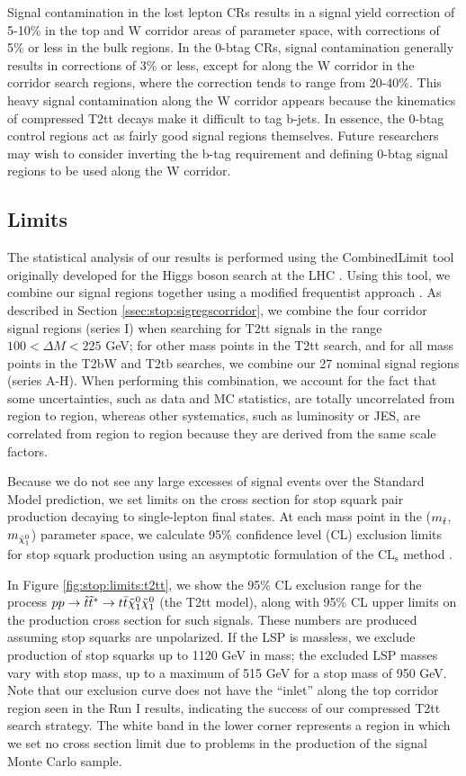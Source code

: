 Signal contamination in the lost lepton CRs results in a signal yield
correction of 5-10\% in the top and W corridor areas of parameter
space, with corrections of 5\% or less in the bulk regions. In the
0-btag CRs, signal contamination generally results in corrections of
3\% or less, except for along the W corridor in the corridor search
regions, where the correction tends to range from 20-40\%. This heavy
signal contamination along the W corridor appears because the
kinematics of compressed T2tt decays make it difficult to tag
b-jets. In essence, the 0-btag control regions act as fairly good
signal regions themselves. Future researchers may wish to consider
inverting the b-tag requirement and defining 0-btag signal regions to
be used along the W corridor.

\subsection{Limits}
\label{ssec:stop:limits}

The statistical analysis of our results is performed using the
CombinedLimit tool originally developed for the Higgs boson search at
the LHC \cite{higgscombine}. Using this tool, we combine our
signal regions together using a modified frequentist approach
\cite{combineregions}. As described in Section
\ref{ssec:stop:sigregscorridor}, we combine the four corridor signal
regions (series I) when searching for T2tt signals in the range $100 < \Delta M <
225$ GeV; for other mass points in the T2tt search, and for all mass
points in the T2bW and T2tb searches, we combine our 27 nominal signal
regions (series A-H). When performing this combination, we account for
the fact that some uncertainties, such as data and MC statistics, are
totally uncorrelated from region to region, whereas other systematics,
such as luminosity or JES, are correlated from region to region
because they are derived from the same scale factors.

Because we do not see any large excesses of signal events over the
Standard Model prediction, we set limits on the cross section for
stop squark pair production decaying to single-lepton final states.
At each mass point in the ($m_{\tilde{t}}$, $m_{\tilde{\chi}^0_1}$) parameter space,
we calculate 95\% confidence level (CL) exclusion limits for stop squark
production using an asymptotic formulation of the
CL$_\text{s}$ method \cite{cls,asymptotic}.

In Figure \ref{fig:stop:limits:t2tt}, we show the 95\% CL exclusion
range for the process $pp \rightarrow \tilde{t}\tilde{t}^* \rightarrow
t\bar{t} \tilde{\chi}^0_1 \tilde{\chi}^0_1$ (the T2tt model), along with 95\% CL upper limits on
the production cross section for such signals. These numbers are
produced assuming stop squarks are unpolarized. If the LSP is
massless, we exclude production of stop squarks up to 1120 GeV in
mass; the excluded LSP masses vary with stop mass, up to a maximum of
515 GeV for a stop mass of 950 GeV. Note that our exclusion curve does
not have the ``inlet'' along the top corridor region seen in the Run I
results, indicating the success of our compressed T2tt search
strategy. The white band in the lower corner represents a region in
which we set no cross section limit due to problems in the
production of the signal Monte Carlo sample.

